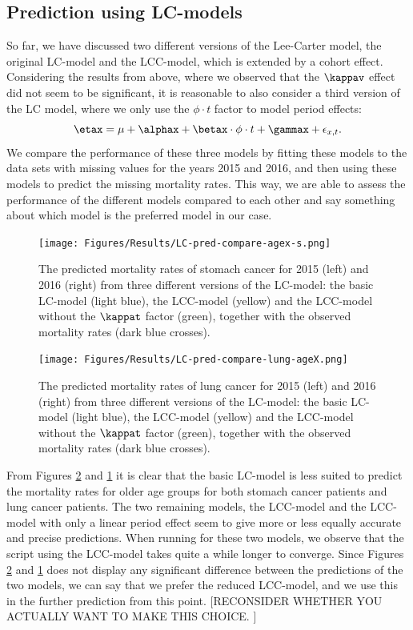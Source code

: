 \subsection{Prediction using LC-models}
So far, we have discussed two different versions of the Lee-Carter model, the original LC-model and the LCC-model, which is extended by a cohort effect. Considering the results from above, where we observed that the $\kappav$ effect did not seem to be significant, it is reasonable to also consider a third version of the LC model, where we only use the $\phi \cdot t$ factor to model period effects:
\begin{equation}
    \etax = \mu + \alphax + \betax\cdot\phi\cdot t + \gammax + \epsilon_{x,t}.
    \label{eq:LClinear}
\end{equation}
We compare the performance of these three models by fitting these models to the data sets with missing values for the years 2015 and 2016, and then using these models to predict the missing mortality rates. This way, we are able to assess the performance of the different models compared to each other and say something about which model is the preferred model in our case. 

\begin{figure}
    \centering
    \texttt{[image: Figures/Results/LC-pred-compare-agex-s.png]}
    \caption{The predicted mortality rates of stomach cancer for 2015 (left) and 2016 (right) from three different versions of the LC-model: the basic LC-model (light blue), the LCC-model (yellow) and the LCC-model without the $\kappat$ factor (green), together with the observed mortality rates (dark blue crosses).}
    \label{fig:LC-compare-s}
\end{figure}

\begin{figure}
    \centering
    \texttt{[image: Figures/Results/LC-pred-compare-lung-ageX.png]}
    \caption{The predicted mortality rates of lung cancer for 2015 (left) and 2016 (right) from three different versions of the LC-model: the basic LC-model (light blue), the LCC-model (yellow) and the LCC-model without the $\kappat$ factor (green), together with the observed mortality rates (dark blue crosses).}
    \label{fig:LC-compare-l}
\end{figure}

From Figures \ref{fig:LC-compare-l} and \ref{fig:LC-compare-s} it is clear that the basic LC-model is less suited to predict the mortality rates for older age groups for both stomach cancer patients and lung cancer patients. The two remaining models, the LCC-model and the LCC-model with only a linear period effect seem to give more or less equally accurate and precise predictions. When running \inlabru for these two models, we observe that the script using the LCC-model takes quite a while longer to converge. Since Figures \ref{fig:LC-compare-l} and \ref{fig:LC-compare-s} does not display any significant difference between the predictions of the two models, we can say that we prefer the reduced LCC-model, and we use this in the further prediction from this point. [RECONSIDER WHETHER YOU ACTUALLY WANT TO MAKE THIS CHOICE. ]

